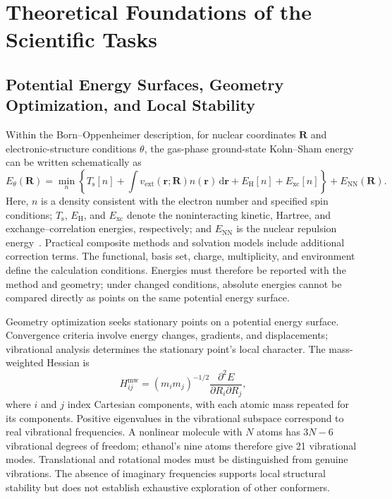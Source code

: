 \documentclass[a4paper,11pt]{article}
\begin{document}
\section{Theoretical Foundations of the Scientific Tasks}
\subsection{Potential Energy Surfaces, Geometry Optimization, and Local Stability}
Within the Born--Oppenheimer description, for nuclear coordinates $\mathbf R$ and electronic-structure conditions $\theta$, the gas-phase ground-state Kohn--Sham energy can be written schematically as
\begin{equation}
  E_{\theta}(\mathbf R)=\min_{n}\!\left\{T_{\mathrm s}[n]
  +\int v_{\mathrm{ext}}(\mathbf r;\mathbf R)n(\mathbf r)\,\mathrm d\mathbf r
  +E_{\mathrm H}[n]+E_{\mathrm{xc}}[n]\right\}
  +E_{\mathrm{NN}}(\mathbf R).
\end{equation}
Here, $n$ is a density consistent with the electron number and specified spin conditions; $T_{\mathrm s}$, $E_{\mathrm H}$, and $E_{\mathrm{xc}}$ denote the noninteracting kinetic, Hartree, and exchange--correlation energies, respectively; and $E_{\mathrm{NN}}$ is the nuclear repulsion energy~\cite{hk,ks}.
Practical composite methods and solvation models include additional correction terms.
The functional, basis set, charge, multiplicity, and environment define the calculation conditions.
Energies must therefore be reported with the method and geometry; under changed conditions, absolute energies cannot be compared directly as points on the same potential energy surface.

Geometry optimization seeks stationary points on a potential energy surface.
Convergence criteria involve energy changes, gradients, and displacements; vibrational analysis determines the stationary point's local character.
The mass-weighted Hessian is
\begin{equation}
  H^{\mathrm{mw}}_{ij}=(m_i m_j)^{-1/2}
  \frac{\partial^2 E}{\partial R_i\partial R_j},
\end{equation}
where $i$ and $j$ index Cartesian components, with each atomic mass repeated for its components.
Positive eigenvalues in the vibrational subspace correspond to real vibrational frequencies.
A nonlinear molecule with $N$ atoms has $3N-6$ vibrational degrees of freedom; ethanol's nine atoms therefore give 21 vibrational modes.
Translational and rotational modes must be distinguished from genuine vibrations.
The absence of imaginary frequencies supports local structural stability but does not establish exhaustive exploration of other conformers.
\end{document}
